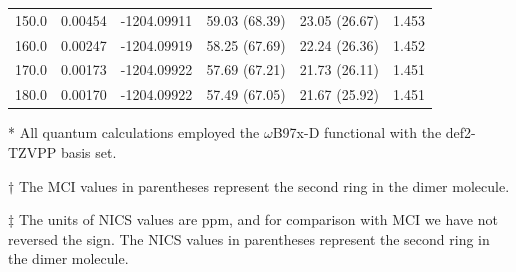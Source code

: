 \begin{table}[hbt!]
\begin{threeparttable}
\begin{tabular}{cccccc}
150.0 & 0.00454 & -1204.09911 & 59.03 (68.39) & 23.05 (26.67) & 1.453 \\
160.0 & 0.00247 & -1204.09919 & 58.25 (67.69) & 22.24 (26.36) & 1.452 \\
170.0 & 0.00173 & -1204.09922 & 57.69 (67.21) & 21.73 (26.11) & 1.451 \\
180.0 & 0.00170 & -1204.09922 & 57.49 (67.05) & 21.67 (25.92) & 1.451 \\ \bottomrule
\end{tabular}
\begin{tablenotes}
\item[*] \footnotesize All quantum calculations employed the $\omega$B97x-D functional with the def2-TZVPP basis set.
\item [$\dagger$] \footnotesize The MCI values in parentheses represent the second ring in the dimer molecule.
\item [$\ddagger$] \footnotesize The units of NICS values are ppm, and for comparison with MCI we have not reversed the sign. The NICS values in parentheses represent the second ring in the dimer molecule.
\end{tablenotes}
\end{threeparttable}
\end{table}

